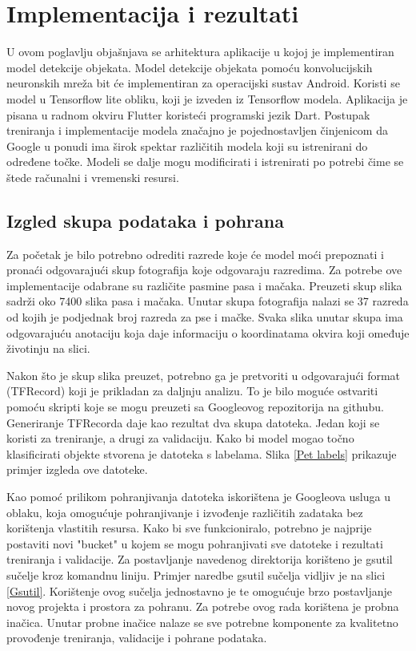 \chapter{Implementacija i rezultati} \label {Implementacija i rezultati}
U ovom poglavlju objašnjava se arhitektura aplikacije u kojoj je implementiran model detekcije objekata. 
Model detekcije objekata pomoću konvolucijskih neuronskih mreža bit će implementiran za 
operacijski sustav Android. Koristi se model u Tensorflow lite obliku, koji je izveden iz Tensorflow modela.
Aplikacija je pisana u radnom okviru Flutter koristeći programski jezik Dart. \newline
Postupak treniranja i implementacije modela značajno je pojednostavljen činjenicom da Google u ponudi ima širok spektar različitih modela koji su istrenirani
do određene točke. Modeli se dalje mogu modificirati i istrenirati po potrebi čime se štede računalni i vremenski resursi. 

\section{Izgled skupa podataka i pohrana}
Za početak je bilo potrebno odrediti razrede koje će model moći prepoznati i pronaći odgovarajući skup fotografija koje odgovaraju razredima. Za potrebe ove implementacije odabrane su različite pasmine pasa i mačaka. 
Preuzeti skup slika sadrži oko 7400 slika pasa i mačaka. Unutar skupa fotografija nalazi se 37 razreda od kojih je podjednak
broj razreda za pse i mačke. Svaka slika unutar skupa ima odgovarajuću anotaciju koja daje informaciju o koordinatama okvira koji omeđuje životinju na slici. 

Nakon što je skup slika preuzet, potrebno ga je pretvoriti u odgovarajući format (TFRecord) koji je prikladan za daljnju analizu. To je bilo moguće ostvariti pomoću skripti koje se mogu preuzeti sa Googleovog repozitorija na githubu.
Generiranje TFRecorda daje kao rezultat dva skupa datoteka. Jedan koji se koristi za treniranje, a drugi za validaciju. Kako bi model mogao točno klasificirati objekte stvorena
je datoteka s labelama. Slika \ref{Pet labels} prikazuje primjer izgleda ove datoteke.

Kao pomoć prilikom pohranjivanja datoteka iskorištena je Googleova usluga u oblaku, koja omogućuje pohranjivanje i izvođenje različitih zadataka bez korištenja vlastitih resursa. 
Kako bi sve funkcioniralo, potrebno je najprije postaviti novi \newline "bucket" u kojem se mogu pohranjivati sve datoteke i rezultati treniranja i validacije. Za postavljanje navedenog direktorija korišteno je gsutil sučelje kroz 
komandnu liniju. Primjer naredbe gsutil sučelja vidljiv je na slici \ref{Gsutil}. Korištenje ovog sučelja jednostavno je te omogućuje brzo postavljanje novog projekta i prostora za pohranu. Za potrebe ovog rada korištena je probna inačica. 
Unutar probne inačice nalaze se sve potrebne komponente za kvalitetno provođenje treniranja, validacije i pohrane podataka.

